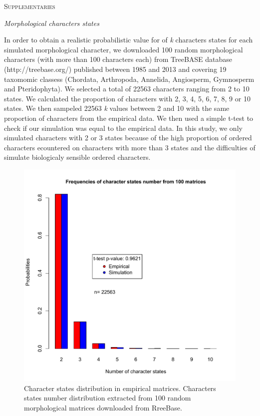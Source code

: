 \documentclass[12pt,letterpaper]{article}
\renewcommand{\section}[1]{%
\bigskip
\begin{center}
\begin{Large}
\normalfont\scshape #1
\medskip
\end{Large}
\end{center}}
\renewcommand{\subsection}[1]{%
\bigskip
\begin{center}
\begin{large}
\normalfont\itshape #1
\end{large}
\end{center}}
\begin{document}

\section{Supplementaries}
\label{supplementaries}
\subsection{Morphological characters states}
In order to obtain a realistic probabilistic value for of \textit{k} characters states for each simulated morphological character, we downloaded 100 random morphological characters (with more than 100 characters each) from TreeBASE database (http://treebase.org/) published between 1985 and 2013 and covering 19 taxomomic classess (Chordata, Arthropoda, Annelida, Angiosperm, Gymnosperm and Pteridophyta).
We selected a total of 22563 characters ranging from 2 to 10 states.
We calculated the proportion of characters with 2, 3, 4, 5, 6, 7, 8, 9 or 10 states.
We then sampeled 22563 \textit{k} values between 2 and 10 with the same proportion of characters from the empirical data.
We then used a simple t-test to check if our simulation was equal to the empirical data.
In this study, we only simulated characters with 2 or 3 states because of the high proportion of ordered characters ecountered on characters with more than 3 states and the difficulties of simulate biologicaly sensible ordered characters.

\begin{figure}
\centering
\includegraphics[keepaspectratio=true]{Figures/TEM_Fig-AppendixCharacters.pdf}
\caption{Character states distribution in empirical matrices. %
Characters states number distribution extracted from 100 random morphological matrices downloaded from RreeBase.}
\label{Fig_AppendixCharacters}
\end{figure}
\end{document}
